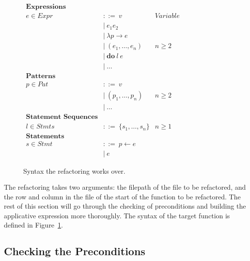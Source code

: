 \begin{figure}[t]
	\begin{math}
		\begin{aligned}
\textbf{Expressions}\\
e \in Expr\ &::=\ v\qquad &Variable\\
&|\ e_1 e_2\\
&|\ \lambda p \rightarrow e\\
&|\ (e_1, \ldots, e_n) &n \geq 2\\
&|\ \textbf{do}\ l\ e\\
&|\ \ldots\\
\textbf{Patterns}\\
p \in Pat\ &::=\ v\\
&|\ (p_1, \ldots, p_n) &n \geq 2\\
&|\ \ldots \\
\textbf{Statement Sequences}\\
l \in Stmts\ &::=\ \{s_1, \ldots, s_n\} &n \geq 1\\
\textbf{Statements}\\
s \in Stmt\ &::=\ p \leftarrow e\\
&|\ e
		\end{aligned}
	\end{math}
	\caption{Syntax the refactoring works over.}
	\label{syntax}
\end{figure}

The refactoring takes two arguments: the filepath of the file to be refactored, and the row and column in the file of the start of the function to be refactored. The rest of this section will go through the checking of preconditions and building the applicative expression more thoroughly. The syntax of the target function is defined in Figure~\ref{syntax}.



\subsection{Checking the Preconditions}

